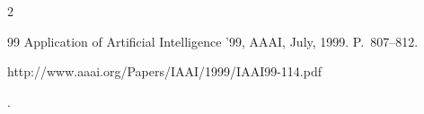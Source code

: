 \begin{multicols}{2}
{{\begin{thebibliography}{99}
Application of Artificial Intelligence '99, AAAI, July, 1999. P.~807--812. {\sf 


http://www.aaai.org/Papers/IAAI/1999/IAAI99-114.pdf}.








 \end{thebibliography}


}


}








\end{multicols}


